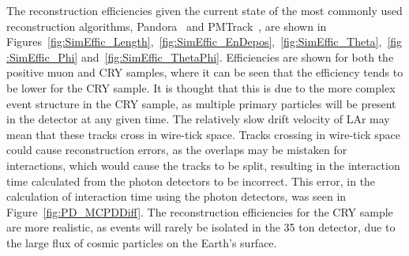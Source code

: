 The reconstruction efficiencies given the current state of the most commonly used reconstruction algorithms, Pandora~\citep{Pandora} and PMTrack~\citep{PMTrack}, are shown in Figures~\ref{fig:SimEffic_Length},~\ref{fig:SimEffic_EnDepos},~\ref{fig:SimEffic_Theta},~\ref{fig:SimEffic_Phi} and~\ref{fig:SimEffic_ThetaPhi}. Efficiencies are shown for both the positive muon and CRY samples, where it can be seen that the efficiency tends to be lower for the CRY sample. It is thought that this is due to the more complex event structure in the CRY sample, as multiple primary particles will be present in the detector at any given time. The relatively slow drift velocity of LAr may mean that these tracks cross in wire-tick space. Tracks crossing in wire-tick space could cause reconstruction errors, as the overlaps may be mistaken for interactions, which would cause the tracks to be split, resulting in the interaction time calculated from the photon detectors to be incorrect. This error, in the calculation of interaction time using the photon detectors, was seen in Figure~\ref{fig:PD_MCPDDiff}. The reconstruction efficiencies for the CRY sample are more realistic, as events will rarely be isolated in the 35 ton detector, due to the large flux of cosmic particles on the Earth's surface. \\

